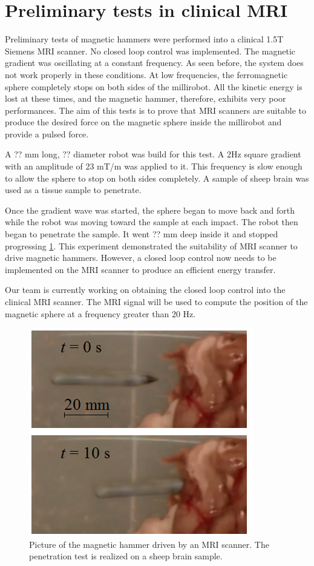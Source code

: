 \documentclass[letterpaper, 10 pt, conference]{ieeeconf}  %
\begin{document}
\section{Preliminary tests in clinical MRI}

Preliminary tests of magnetic hammers were performed into a clinical 1.5T Siemens MRI scanner. No closed loop control was implemented. The magnetic gradient was oscillating at a constant frequency. As seen before, the system does not work properly in these conditions. At low frequencies, the ferromagnetic sphere completely stops on both sides of the millirobot. All the kinetic energy is lost at these times, and the magnetic hammer, therefore, exhibits very poor performances. The aim of this tests is to prove that MRI scanners are suitable to produce the desired force on the magnetic sphere inside the millirobot and provide a pulsed force.\par
A ?? mm long, ?? diameter robot was build for this test. A 2Hz square gradient with an amplitude of 23 mT/m was applied to it. This frequency is slow enough to allow the sphere to stop on both sides completely. A sample of sheep brain was used as a tissue sample to penetrate.\par
Once the gradient wave was started, the sphere began to move back and forth while the robot was moving toward the sample at each impact. The robot then began to penetrate the sample. It went ?? mm deep inside it and stopped progressing \ref{MRI_test}. 
This experiment demonstrated the suitability of MRI scanner to drive magnetic hammers. However, a closed loop control now needs to be implemented on the MRI scanner to produce an efficient energy transfer. \par
Our team is currently working on obtaining the closed loop control into the clinical MRI scanner. The MRI signal will be used to compute the position of the magnetic sphere at a frequency greater than 20 Hz.

\begin{figure}
\centering
  \includegraphics[width=150 pt]{tests_in_MRI.png}
  \caption{Picture of the magnetic hammer driven by an MRI scanner. The penetration test is realized on a sheep brain sample.}
  \label{MRI_test}
\end{figure}
\end{document}
